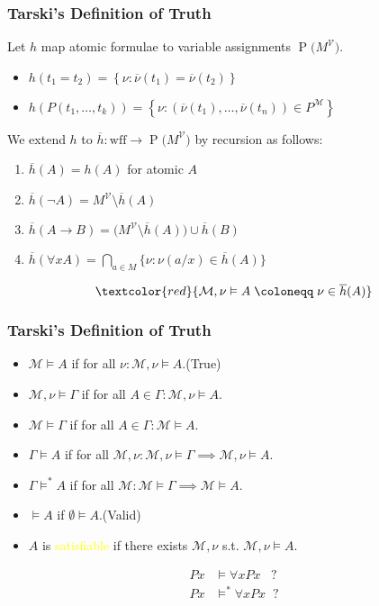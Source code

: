 \documentclass[UTF8,aspectratio=43,11pt,colorlinks,compress,openany]{beamer}%
\begin{document}
\begin{frame}\frametitle{Tarski's Definition of Truth}
	Let $h$ map atomic formulae to variable assignments $\operatorname{P}\big(M^{\mathcal{V}}\big)$.
	\begin{itemize}
		\item $h(t_1=t_2)=\left\{\nu:\overline{\nu}(t_1)=\overline{\nu}(t_2)\right\}$
		\item $h(P(t_1,\dots,t_k))=\left\{\nu:(\overline{\nu}(t_1),\dots,\overline{\nu}(t_n))\in P^{\mathcal{M}}\right\}$
	\end{itemize}
	We extend $h$ to $\overline{h}:\mathrm{wff}\to \operatorname{P}\big(M^{\mathcal{V}}\big)$ by recursion as follows:\\
	\vspace{2ex}
	\begin{block}{}
		\begin{enumerate}
			\item $\overline{h}(A)=h(A)$ for atomic $A$
			\item $\overline{h}(\neg A)=M^{\mathcal{V}}\setminus\overline{h}(A)$
			\item $\overline{h}(A\to B)=\big(M^{\mathcal{V}}\setminus\overline{h}(A)\big)\cup\overline{h}(B)$
			\item $\overline{h}(\forall x A)=\bigcap\limits_{a\in M}\big\{\nu: \nu(a/x)\in\overline{h}(A)\big\}$
		\end{enumerate}
	\end{block}
	\[\textcolor{red}{\mathcal{M},\nu\vDash A \;\coloneqq \;\nu\in\overline{h}(A)}\]
\end{frame}

\begin{frame}\frametitle{Tarski's Definition of Truth}
		\begin{block}{}
			\begin{itemize}
				\item $\mathcal{M}\vDash A$ if for all $\nu:\mathcal{M},\nu\vDash A$.\hfill (True)
				\item $\mathcal{M},\nu\vDash\Gamma$ if for all $A\in\Gamma: \mathcal{M},\nu\vDash A$.
				\item $\mathcal{M}\vDash\Gamma$ if for all $A\in\Gamma:\mathcal{M}\vDash A$.
				\item $\Gamma\vDash A$ if for all $\mathcal{M},\nu: \mathcal{M},\nu\vDash\Gamma\implies\mathcal{M},\nu\vDash A$.
				\item $\Gamma\vDash^* A$ if for all $\mathcal{M}:\mathcal{M}\vDash\Gamma\implies\mathcal{M}\vDash A$.
				\item $\vDash A$ if $\emptyset\vDash A$.\hfill (Valid)
				\item $A$ is \textcolor{yellow}{satisfiable} if there exists $\mathcal{M},\nu$ s.t. $\mathcal{M},\nu\vDash A$.
			\end{itemize}
		\end{block}
\begin{align*}
Px&\vDash\forall xPx\;\;\;?\\
Px&\vDash^*\forall xPx\;\;?
\end{align*}
\end{frame}
\end{document}
